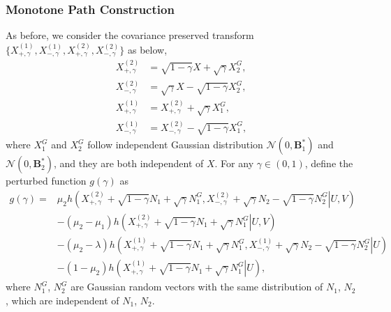 \documentclass[journal,final, onecolumn]{IEEEtran}
\begin{document}
\subsubsection{Monotone Path Construction} As before, we consider the covariance preserved transform $\{X^{(1)}_{+,\gamma}, X^{(1)}_{-,\gamma}, X^{(2)}_{+,\gamma}, X^{(2)}_{-,\gamma}\}$ as below,
\begin{align}
X^{(2)}_{+,\gamma} &=\sqrt{1-\gamma}X + \sqrt{\gamma}X_2^{G}, \label{eq:tr1}\\
X^{(2)}_{-,\gamma} &=\sqrt{\gamma}X - \sqrt{1-\gamma}X_2^{G}, \label{eq:tr2}\\
X^{(1)}_{+,\gamma} &=X^{(2)}_{+,\gamma}+\sqrt{\gamma}X_1^{G}, \label{eq:tr3}\\
X^{(1)}_{-,\gamma} &=X^{(2)}_{-,\gamma}- \sqrt{1-\gamma}X_1^{G}, \label{eq:tr4}
\end{align}
where $X_1^{G}$ and $X_{2}^{G}$ follow independent Gaussian distribution $\mathcal{N}(0, \boldsymbol{B}_{1}^{*})$ and $\mathcal{N}(0, \boldsymbol{B}_{2}^{*})$, and they are both independent of $X$.
For any $\gamma \in (0,1)$, define the perturbed function $g(\gamma)$ as
\begin{align}
g(\gamma) =& \mu_{2} h \left(\left. X^{(2)}_{+,\gamma}+\sqrt{1-\gamma}N_{1} + \sqrt{\gamma} N_{1}^{G}, X^{(2)}_{-,\gamma}+\sqrt{\gamma}N_{2} - \sqrt{1-\gamma} N_{2}^{G} \right| U,V\right)\nonumber \\
&-(\mu_{2}-\mu_{1}) h \left(\left. X^{(2)}_{+,\gamma}+\sqrt{1-\gamma}N_{1} + \sqrt{\gamma} N_{1}^{G} \right|U,V\right) \nonumber \\
&-(\mu_2-\lambda) h \left(\left. X^{(1)}_{+,\gamma}+\sqrt{1-\gamma}N_{1} + \sqrt{\gamma} N_{1}^{G}, X^{(1)}_{-,\gamma}+\sqrt{\gamma}N_{2} - \sqrt{1-\gamma} N_{2}^{G} \right| U \right)\nonumber \\
&-(1-\mu_{2})h \left(\left. X^{(1)}_{+,\gamma}+\sqrt{1-\gamma}N_{1} + \sqrt{\gamma} N_{1}^{G} \right|U \right),
\end{align}
where $N_{1}^{G}$, $N_{2}^{G}$ are Gaussian random vectors with the same distribution of $N_1$, $N_2$, which are independent of $N_1$, $N_2$.
\end{document}
